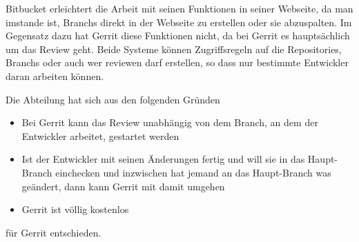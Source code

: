 Bitbucket erleichtert die Arbeit mit seinen Funktionen in seiner Webseite, da man imstande ist, Branchs direkt in der Webseite zu erstellen oder sie abzuspalten. Im Gegensatz dazu hat Gerrit diese Funktionen nicht, da bei Gerrit es hauptsächlich um das Review geht. Beide Systeme können Zugriffsregeln auf die Repositories, Branchs oder auch wer reviewen darf erstellen, so dass nur bestimmte Entwickler daran arbeiten können.

Die Abteilung hat sich aus den folgenden Gründen

\begin{itemize}
	\item Bei Gerrit kann das Review unabhängig von dem Branch, an dem der Entwickler arbeitet, gestartet werden
	\item Ist der Entwickler mit seinen Änderungen fertig und will sie in das Haupt-Branch einchecken und inzwischen hat jemand an das Haupt-Branch was geändert, dann kann Gerrit 		mit damit umgehen
	\item Gerrit ist völlig kostenlos
\end{itemize}

für Gerrit entschieden.